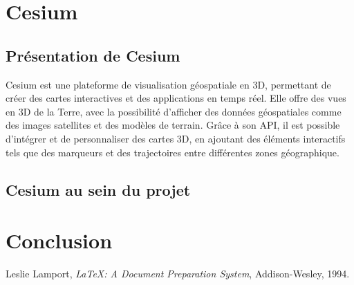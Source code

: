 \documentclass[a4paper,12pt]{article}
\begin{document}
\section{Cesium}

\subsection{Présentation de Cesium}
Cesium est une plateforme de visualisation géospatiale en 3D, permettant de créer des cartes interactives et des applications en temps réel. Elle offre des vues en 3D de la Terre, avec la possibilité d'afficher des données géospatiales comme 
des images satellites et des modèles de terrain. Grâce à son API, il est possible d'intégrer et de personnaliser des cartes 3D, en ajoutant des éléments interactifs tels que des marqueurs et des trajectoires entre différentes zones géographique.

\subsection{Cesium au sein du projet}


\section{Conclusion}


\newpage
\begin{thebibliography}{9}
     Leslie Lamport, \textit{LaTeX: A Document Preparation System}, Addison-Wesley, 1994.
\end{thebibliography}
\end{document}
